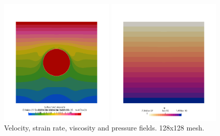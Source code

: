 \begin{center}
\includegraphics[width=5.5cm]{python_codes/fieldstone_87/results/experiment_06/eta.png}
\includegraphics[width=5.5cm]{python_codes/fieldstone_87/results/experiment_06/p.png}\\
{\captionfont Velocity, strain rate, viscosity and pressure fields. 128x128 mesh.}
\end{center}


